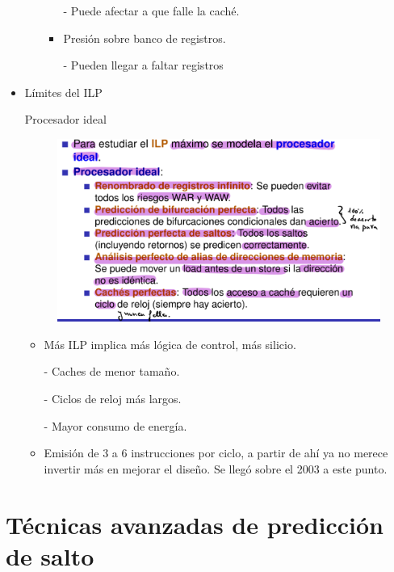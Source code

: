 \documentclass[12pt, twoside, openright]{report} %
\begin{document}
\begin{itemize}
\begin{itemize}
\begin{itemize}
    - Puede afectar a que falle la caché.
    \item Presión sobre banco de registros.
    
    - Pueden llegar a faltar registros
  \end{itemize}
      
\end{itemize}
    

\item Límites del ILP 

Procesador ideal

\begin{figure}[H]
	{\includegraphics[scale=.3]{Untitled 11.png}}
\end{figure}

  \begin{itemize}
  \item Más ILP implica más lógica de control, más silicio.
       
        - Caches de menor tamaño.

        - Ciclos de reloj más largos.

        - Mayor consumo de energía.
  \item Emisión de 3 a 6 instrucciones por ciclo, a partir de ahí ya no merece invertir más en mejorar el diseño. Se llegó sobre el 2003 a este punto.
  \end{itemize}
\end{itemize}




\section{Técnicas avanzadas de predicción de salto}
\end{document}
